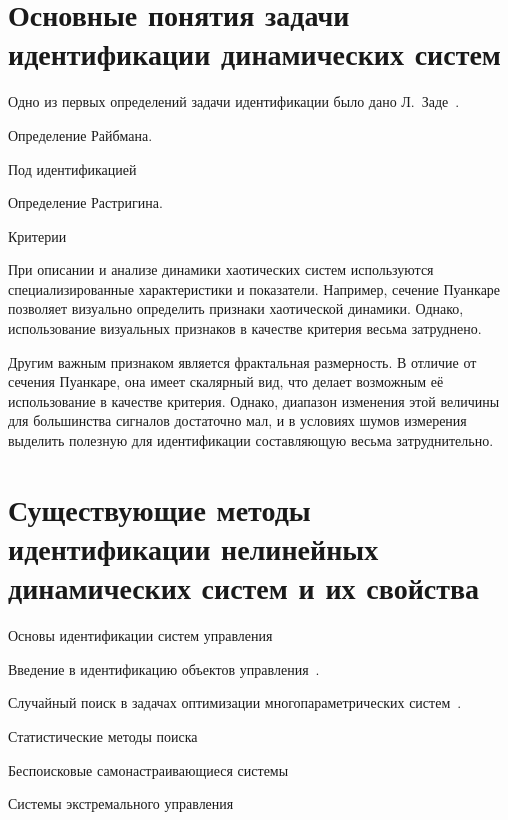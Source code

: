
\section{Основные понятия задачи идентификации динамических систем} %

Одно из первых определений задачи идентификации было дано
Л.~Заде~\cite{zadeh_id_1956}.

Определение Райбмана.

Под идентификацией

Определение Растригина.



Критерии

При описании и анализе динамики хаотических
систем используются специализированные характеристики и показатели.
Например, сечение Пуанкаре~\cite{moon_chaotic_vibr,anisch_complex_vibrations_in_simple_systems,atu_st105}
позволяет визуально определить признаки хаотической динамики.
Однако, использование визуальных признаков в качестве критерия
весьма затруднено.

Другим важным признаком является фрактальная размерность. %
В отличие от сечения Пуанкаре, она имеет скалярный вид,
что делает возможным её использование в качестве критерия.
Однако, диапазон изменения этой величины для большинства сигналов достаточно мал,
и в условиях шумов измерения выделить полезную
для идентификации составляющую весьма затруднительно.


\section{Существующие методы идентификации нелинейных динамических систем и их свойства}  %


Основы идентификации систем управления~\cite{eykhoff_id_base,eykhoff_modern_id,gropp_methods_id,deith_method_id_ds,lung_id_sys,seidg_id_su,leondes_modern_tu,nelles_nlsys_id}

Введение в идентификацию объектов управления~\cite{rastr_intro,rastr_adop_complex_sys}.

Случайный поиск в задачах оптимизации многопараметрических систем~\cite{rastr_rand_search,rastr_rand_search_adopt}.

Статистические методы поиска~\cite{rastr_stat_meth_search}

Беспоисковые самонастраивающиеся системы~\cite{kozlov_nosearch_sns}

Системы экстремального управления~\cite{rastr_seu,kras_dyn_nsn}

